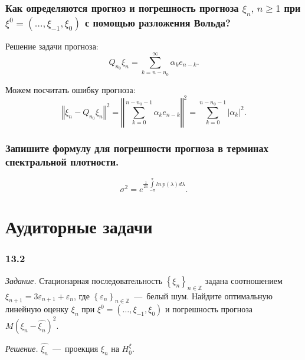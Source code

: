 \subsubsection*{Как определяются прогноз и погрешность прогноза $ \xi_n, \, n \geq 1$ при
                $ \xi^0 = \left( \dotsc, \xi_{-1}, \xi_0 \right) $ с помощью разложения Вольда?}

Решение задачи прогноза:
\begin{equation*}
  Q_{n_0} \xi_n =
  \sum \limits_{k = n - n_0}^{ \infty } \alpha_k e_{n - k}.
\end{equation*}

Можем посчитать ошибку прогноза:
\begin{equation*}
  \left \Vert \xi_n - Q_{n_0} \xi_n \right \Vert^2 =
  \left \Vert \sum \limits_{k = 0}^{n - n_0 - 1} \alpha_k e_{n - k} \right \Vert^2 =
  \sum \limits_{k = 0}^{n - n_0 - 1} \left| \alpha_k \right|^2.
\end{equation*}

\subsubsection*{Запишите формулу для погрешности прогноза в терминах спектральной плотности.}

\begin{equation*}
  \sigma^2 =
  e^{ \frac{1}{2 \pi } \int \limits_{-\pi }^{ \pi } ln \, p \left( \lambda \right) d \lambda }.
\end{equation*}

\section*{Аудиторные задачи}

\subsubsection*{13.2}

\textit{Задание.}
Стационарная последовательность $ \left\{ \xi_n \right\}_{n \in \mathbb{Z}}$ задана соотношением
$ \xi_{n + 1} =
  3 \varepsilon_{n + 1} + \varepsilon_n$,
где $ \left\{ \varepsilon_n \right\}_{n \in \mathbb{Z}}$~---~белый шум.
Найдите оптимальную линейную оценку $ \xi_n$ при $ \xi^0 = \left( \dotsc, \xi_{-1}, \xi_0 \right) $
и погрешность прогноза $M \left( \xi_n - \hat{ \xi_n} \right)^2$.

\textit{Решение.}
$ \hat{ \xi_n}$~---~проекция $ \xi_n$ на $H_0^{ \xi }$.

